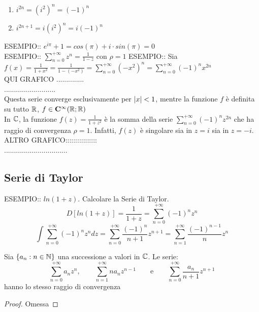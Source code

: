 \begin{enumerate}
	\item $i^{2n}=\left(i^2\right)^n=(-1)^n$
	\item $i^{2n+1}=i\left(i^2\right)^n=i(-1)^n$
\end{enumerate}
ESEMPIO:: $e^{i\pi}+1=cos(\pi)+i\cdot sin(\pi)=0$\\
ESEMPIO:: $\sum\limits_{n=0}^{+\infty}z^n=\frac{1}{1-z}$ con $\rho=1$
ESEMPIO:: Sia $f(x)=\frac{1}{1+x^2}=\frac{1}{1-(-x^2)} = \sum\limits_{n=0}^{+\infty}(-x^2)^n=\sum\limits_{n=0}^{+\infty}(-1)^nx^{2n}$\\
QUI GRAFICO ..............\\
..........................\\
Questa serie converge esclusivamente per $\left|x\right|<1$, mentre la funzione $f$ è definita su tutto $ \mathbb{R}$, $f\in \mathbf{C^{\infty}}( \mathbb{R}; \mathbb{R})$\\
In $\mathbb{C}$, la funzione $f(z)=\frac{1}{1+z^2}$ è la somma della serie $\sum\limits_{n=0}^{+\infty}(-1)^nz^{2n}$ che ha raggio di convergenza  $\rho=1$. Infatti, $f(z)$ è singolare sia in $z=i$ sia in $z=-i$.\\
ALTRO GRAFICO::::::::::::::::\\
................................\\

\subsection{Serie di Taylor}
ESEMPIO:: $ln(1+z)$. Calcolare la Serie di Taylor.
\[D\left[ln(1+z)\right] = \frac{1}{1+z} = \sum\limits_{n=0}^{+\infty}(-1)^nz^n\]
\[\int \sum\limits_{n=0}^{+\infty}(-1)^nz^n dz = \sum\limits_{n=0}^{+\infty}\frac{(-1)^n}{n+1}z^{n+1}=\sum\limits_{n=1}^{+\infty}\frac{(-1)^{n-1}}{n}z^n\]
\begin{lemma}
	\label{lemma:taylor_rad_convergency}
	Sia $\left\{a_n:n \in \mathbb{N}\right\}$ una successione a valori in $\mathbb{C}$. Le serie:
	\[\sum_{n=0}^{+\infty} a_n z^n ,\qquad \sum_{n=1}^{+\infty} n a_n z^{n-1} \qquad\text{e}\qquad \sum_{n=0}^{+\infty} \frac{a_n}{n+1}z^{n+1}\]
	hanno lo stesso raggio di convergenza
	\begin{proof}
		Omessa
	\end{proof}
\end{lemma}

